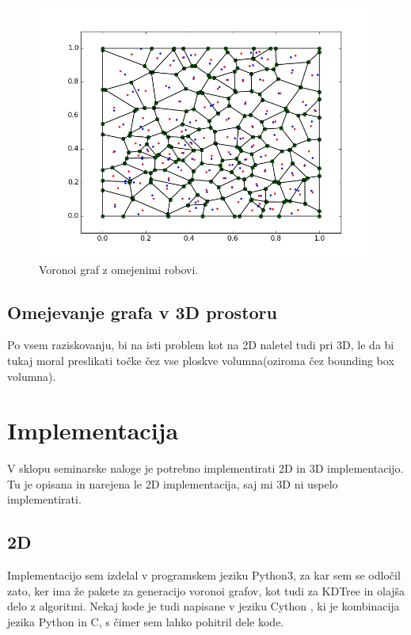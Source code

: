 \documentclass{egpubl}
\begin{document}
	\begin{figure}[htb]
		\centering
		\parbox[t]{.9\columnwidth}{\relax
			\includegraphics[width=.95\linewidth]{voronoi.png}
		}
		\caption{\label{fig:voronoi}
			Voronoi graf z omejenimi robovi.}
	\end{figure}
	
	\subsection{Omejevanje grafa v 3D prostoru}
	Po vsem raziskovanju, bi na isti problem kot na 2D naletel tudi pri 3D, le da bi tukaj moral preslikati točke čez vse ploskve volumna(oziroma čez bounding box volumna).
	
	\section{Implementacija}
	
	V sklopu seminarske naloge je potrebno implementirati 2D in 3D implementacijo. Tu je opisana in narejena le 2D implementacija, saj mi 3D ni uspelo implementirati.
	
	\subsection{2D}
	Implementacijo sem izdelal v programskem jeziku Python3, za kar sem se odločil zato, ker ima že pakete za generacijo voronoi grafov, kot tudi za KDTree in olajša delo z algoritmi. Nekaj kode je tudi napisane v jeziku Cython \cite{cython}, ki je kombinacija jezika Python in C, s čimer sem lahko pohitril dele kode.
	
\end{document}
